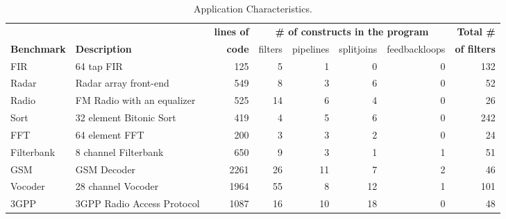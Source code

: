 \begin{table*}[t]
\caption{Application Characteristics.}
\label{tab:benchmarks}
\centering
\footnotesize %
\begin{tabular}{l|l||r||r|r|r|r||r} \hline
 & & {\bf lines of} & \multicolumn{4}{|c||}{\bf \# of constructs in
   the program} & {\bf Total \#} \\ \cline{4-7}
{\bf Benchmark} & {\bf Description} & {\bf code} & filters & pipelines
& splitjoins & feedbackloops & {\bf of filters}
\\
\hline \hline
FIR & 64 tap FIR & 
125 & 5 & 1 & 0 & 0 & 132
\\ \hline
Radar & Radar array front-end\cite{pca} & 
549 & 8 & 3 & 6 & 0 & 52
\\ \hline
Radio & FM Radio with an equalizer & 
525 & 14 & 6 & 4 & 0 & 26
\\ \hline
Sort & 32 element Bitonic Sort & 
419 & 4 & 5 & 6 & 0 & 242
\\  \hline
FFT & 64 element FFT & 
200 & 3 & 3 & 2 & 0 & 24
\\  \hline
Filterbank & 8 channel Filterbank & 
650 & 9 & 3 & 1 & 1 & 51
\\  \hline
GSM & GSM Decoder & 
2261 & 26 & 11 & 7 & 2 & 46
\\ \hline
Vocoder & 28 channel Vocoder~\cite{seneff80}&  
1964 & 55 & 8 & 12 & 1 & 101
\\ \hline
3GPP & 3GPP Radio Access Protocol~\cite{3gpp} &  
1087 & 16 & 10 & 18 & 0 & 48
\\ \hline
\end{tabular}
\end{table*}

